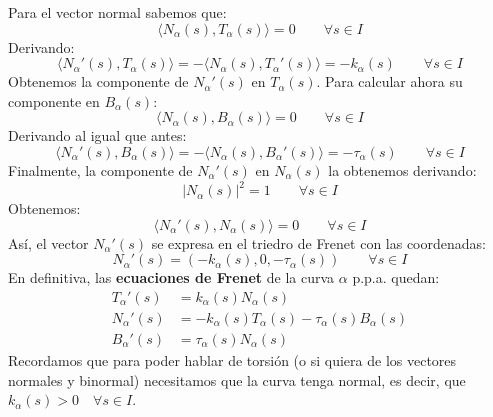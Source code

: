 \noindent
Para el vector normal sabemos que:
\begin{equation*}
    \langle N_\alpha(s),T_\alpha(s) \rangle  = 0 \qquad \forall s \in I
\end{equation*}
Derivando:
\begin{equation*}
    \langle N_\alpha'(s),T_\alpha(s) \rangle  = - \langle N_\alpha(s),T_\alpha'(s) \rangle = -k_\alpha(s) \qquad \forall s\in I
\end{equation*}
Obtenemos la componente de $N_\alpha'(s)$ en $T_\alpha(s)$. Para calcular ahora su componente en $B_\alpha(s)$:
\begin{equation*}
    \langle N_\alpha(s),B_\alpha(s) \rangle = 0 \qquad \forall s \in I
\end{equation*}
Derivando al igual que antes:
\begin{equation*}
    \langle N_\alpha'(s),B_\alpha(s) \rangle  = -\langle N_\alpha(s),B_\alpha'(s) \rangle = -\tau_\alpha(s) \qquad \forall s\in I
\end{equation*}
Finalmente, la componente de $N_\alpha'(s)$ en $N_\alpha(s)$ la obtenemos derivando:
\begin{equation*}
    |N_\alpha(s)|^2 = 1 \qquad \forall s\in I
\end{equation*}
Obtenemos:
\begin{equation*}
    \langle N_\alpha'(s),N_\alpha(s) \rangle  = 0 \qquad \forall s\in I
\end{equation*}
Así, el vector $N_\alpha'(s)$ se expresa en el triedro de Frenet con las coordenadas:
\begin{equation*}
    \boxed{N_\alpha'(s) = (-k_\alpha(s), 0, -\tau_\alpha(s))} \qquad \forall s\in I
\end{equation*}
En definitiva, las \textbf{ecuaciones de Frenet} de la curva $\alpha$ p.p.a. quedan:
\begin{align*}
    T_\alpha'(s) &= k_\alpha(s) N_\alpha(s) \\
    N_\alpha'(s) &= -k_\alpha(s)T_\alpha(s) - \tau_\alpha(s)B_\alpha(s) \\
    B_\alpha'(s) &= \tau_\alpha(s)N_\alpha(s)
\end{align*}
Recordamos que para poder hablar de torsión (o si quiera de los vectores normales y binormal) necesitamos que la curva tenga normal, es decir, que $k_\alpha(s)>0\quad \forall s\in I$.

